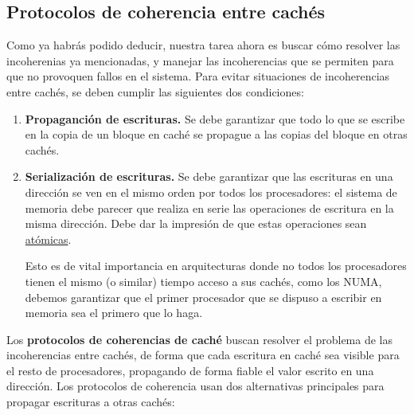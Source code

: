 \subsection{Protocolos de coherencia entre cachés}
Como ya habrás podido deducir, nuestra tarea ahora es buscar cómo resolver las incoherenias ya mencionadas, y manejar las incoherencias que se permiten para que no provoquen fallos en el sistema. Para evitar situaciones de incoherencias entre cachés, se deben cumplir las siguientes dos condiciones:
\begin{enumerate}
    \item \textbf{Propaganción de escrituras.} Se debe garantizar que todo lo que se escribe en la copia de un bloque en caché se propague a las copias del bloque en otras cachés.
    \item \textbf{Serialización de escrituras.} Se debe garantizar que las escrituras en una dirección se ven en el mismo orden por todos los procesadores: el sistema de memoria debe parecer que realiza en serie las operaciones de escritura en la misma dirección. Debe dar la impresión de que estas operaciones sean \underline{atómicas}. 

        Esto es de vital importancia en arquitecturas donde no todos los procesadores tienen el mismo (o similar) tiempo acceso a sus cachés, como los NUMA, debemos garantizar que el primer procesador que se dispuso a escribir en memoria sea el primero que lo haga.
\end{enumerate}
Los \textbf{protocolos de coherencias de caché} buscan resolver el problema de las incoherencias entre cachés, de forma que cada escritura en caché sea visible para el resto de procesadores, propagando de forma fiable el valor escrito en una dirección. Los protocolos de coherencia usan dos alternativas principales para propagar escrituras a otras cachés:
